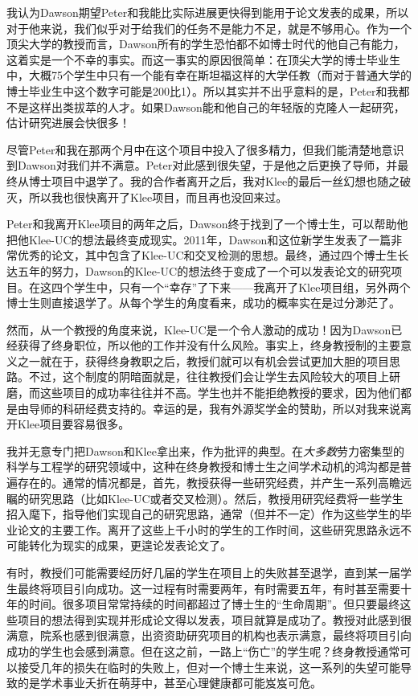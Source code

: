 \documentclass[letter,12pt]{book}
\begin{document}
\begin{CJK}{UTF8}{gbsn}
我认为Dawson期望Peter和我能比实际进展更快得到能用于论文发表的成果，所以对于他来说，我们似乎对于给我们的任务不是能力不足，就是不够用心。作为一个顶尖大学的教授而言，Dawson所有的学生恐怕都不如博士时代的他自己有能力，这着实是一个不幸的事实。而这一事实的原因很简单：在顶尖大学的博士毕业生中，大概75个学生中只有一个能有幸在斯坦福这样的大学任教（而对于普通大学的博士毕业生中这个数字可能是200比1）。所以其实并不出乎意料的是，Peter和我都不是这样出类拔萃的人才。如果Dawson能和他自己的年轻版的克隆人一起研究，估计研究进展会快很多！

尽管Peter和我在那两个月中在这个项目中投入了很多精力，但我们能清楚地意识到Dawson对我们并不满意。Peter对此感到很失望，于是他之后更换了导师，并最终从博士项目中退学了。我的合作者离开之后，我对Klee的最后一丝幻想也随之破灭，所以我也很快离开了Klee项目，而且再也没回来过。

\breakline

Peter和我离开Klee项目的两年之后，Dawson终于找到了一个博士生，可以帮助他把他Klee-UC的想法最终变成现实。2011年，Dawson和这位新学生发表了一篇非常优秀的论文，其中包含了Klee-UC和交叉检测的思想。最终，通过四个博士生长达五年的努力，Dawson的Klee-UC的想法终于变成了一个可以发表论文的研究项目。在这四个学生中，只有一个“幸存”了下来——我离开了Klee项目组，另外两个博士生则直接退学了。从每个学生的角度看来，成功的概率实在是过分渺茫了。

然而，从一个教授的角度来说，Klee-UC是一个令人激动的成功！因为Dawson已经获得了终身职位，所以他的工作并没有什么风险。事实上，终身教授制的主要意义之一就在于，获得终身教职之后，教授们就可以有机会尝试更加大胆的项目思路。不过，这个制度的阴暗面就是，往往教授们会让学生去风险较大的项目上研磨，而这些项目的成功率往往并不高。学生也并不能拒绝教授的要求，因为他们都是由导师的科研经费支持的。幸运的是，我有外源奖学金的赞助，所以对我来说离开Klee项目要容易很多。

我并无意专门把Dawson和Klee拿出来，作为批评的典型。在\emph{大多数}劳力密集型的科学与工程学的研究领域中，这种在终身教授和博士生之间学术动机的鸿沟都是普遍存在的。通常的情况都是，首先，教授获得一些研究经费，并产生一系列高瞻远瞩的研究思路（比如Klee-UC或者交叉检测）。然后，教授用研究经费将一些学生招入麾下，指导他们实现自己的研究思路，通常（但并不一定）作为这些学生的毕业论文的主要工作。离开了这些上千小时的学生的工作时间，这些研究思路永远不可能转化为现实的成果，更遑论发表论文了。

有时，教授们可能需要经历好几届的学生在项目上的失败甚至退学，直到某一届学生最终将项目引向成功。这一过程有时需要两年，有时需要五年，有时甚至需要十年的时间。很多项目常常持续的时间都超过了博士生的“生命周期”。但只要最终这些项目的想法得到实现并形成论文得以发表，项目就算是成功了。教授对此感到很满意，院系也感到很满意，出资资助研究项目的机构也表示满意，最终将项目引向成功的学生也会感到满意。但在这之前，一路上“伤亡”的学生呢？终身教授通常可以接受几年的损失在临时的失败上，但对一个博士生来说，这一系列的失望可能导致的是学术事业夭折在萌芽中，甚至心理健康都可能岌岌可危。


\end{CJK}
\end{document}
